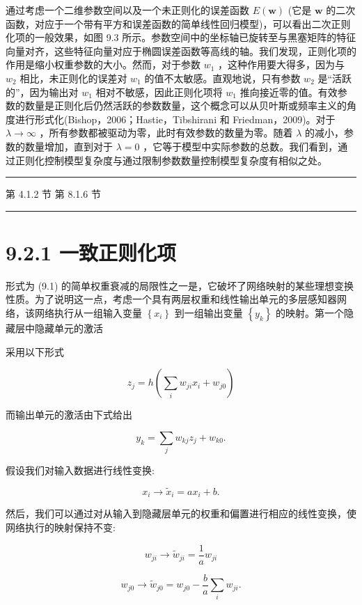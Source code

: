 \documentclass[10pt]{article}
\newcommand{\HRule}{\begin{center}\rule{0.9\linewidth}{0.2mm}\end{center}}
\begin{document}
通过考虑一个二维参数空间以及一个未正则化的误差函数 \(E\left( \mathbf{w}\right)\) (它是 \(\mathbf{w}\) 的二次函数，对应于一个带有平方和误差函数的简单线性回归模型)，可以看出二次正则化项的一般效果，如图 9.3 所示。参数空间中的坐标轴已旋转至与黑塞矩阵的特征向量对齐，这些特征向量对应于椭圆误差函数等高线的轴。我们发现，正则化项的作用是缩小权重参数的大小。然而，对于参数 \({w}_{1}\) ，这种作用要大得多，因为与 \({w}_{2}\) 相比，未正则化的误差对 \({w}_{1}\) 的值不太敏感。直观地说，只有参数 \({w}_{2}\) 是“活跃的”，因为输出对 \({w}_{1}\) 相对不敏感，因此正则化项将 \({w}_{1}\) 推向接近零的值。有效参数的数量是正则化后仍然活跃的参数数量，这个概念可以从贝叶斯或频率主义的角度进行形式化(Bishop，2006；Hastie，Tibshirani 和 Friedman，2009)。对于 \(\lambda  \rightarrow  \infty\) ，所有参数都被驱动为零，此时有效参数的数量为零。随着 \(\lambda\) 的减小，参数的数量增加，直到对于 \(\lambda  = 0\) ，它等于模型中实际参数的总数。我们看到，通过正则化控制模型复杂度与通过限制参数数量控制模型复杂度有相似之处。

\HRule

第 4.1.2 节 第 8.1.6 节

\HRule

\section*{9.2.1 一致正则化项}

形式为 (9.1) 的简单权重衰减的局限性之一是，它破坏了网络映射的某些理想变换性质。为了说明这一点，考虑一个具有两层权重和线性输出单元的多层感知器网络，该网络执行从一组输入变量 \(\left\{  {x}_{i}\right\}\) 到一组输出变量 \(\left\{  {y}_{k}\right\}\) 的映射。第一个隐藏层中隐藏单元的激活

采用以下形式

\[
{z}_{j} = h\left( {\mathop{\sum }\limits_{i}{w}_{ji}{x}_{i} + {w}_{j0}}\right)  \tag{9.6}
\]

而输出单元的激活由下式给出

\[
{y}_{k} = \mathop{\sum }\limits_{j}{w}_{kj}{z}_{j} + {w}_{k0}. \tag{9.7}
\]

假设我们对输入数据进行线性变换:

\[
{x}_{i} \rightarrow  {\widetilde{x}}_{i} = a{x}_{i} + b. \tag{9.8}
\]

然后，我们可以通过对从输入到隐藏层单元的权重和偏置进行相应的线性变换，使网络执行的映射保持不变:

\[
{w}_{ji} \rightarrow  {\widetilde{w}}_{ji} = \frac{1}{a}{w}_{ji} \tag{9.9}
\]

\[
{w}_{j0} \rightarrow  {\widetilde{w}}_{j0} = {w}_{j0} - \frac{b}{a}\mathop{\sum }\limits_{i}{w}_{ji}. \tag{9.10}
\]
\end{document}
